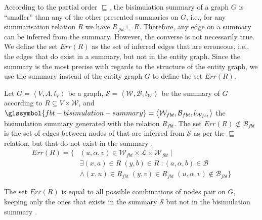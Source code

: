 According to the partial order $\sqsubseteq$, the bisimulation summary  of a graph $G$ is ``smaller'' than any of the other presented summaries on $G$, i.e., for any summarisation relation $R$ we have $R_{fbt} \sqsubseteq R$. Therefore, any edge on a summary can be inferred from the  summary. However, the converse is not necessarily true.\\

We define the set $Err(R)$ as the set of inferred edges that are erroneous, i.e., the edges that do exist in a summary, but not in the entity graph. Since the summary  is the most precise with regards to the structure of the entity graph, we use the summary  instead of the entity graph $G$ to define the set $Err(R)$.

\begin{definition}
Let $G=\left\langle V, A, l_V \right\rangle$ be a graph, $\mathcal{S} = \left\langle \mathcal{W}, \mathcal{B}, l_{\mathcal{W}} \right\rangle$ be the summary of $G$ according to $R \subseteq V \times \mathcal{W}$, and $\glssymbol{fbt-bisimulation-summary} = \left\langle \mathcal{W}_{fbt}, \mathcal{B}_{fbt}, l_{\mathcal{W}_{fbt}} \right\rangle$ the bisimulation summary generated with the relation $R_{fbt}$.
The set $Err(R) \not \subset \mathcal{B}_{fbt}$ is the set of edges between nodes of  that are inferred from $\mathcal{S}$ as per the $\sqsubseteq$ relation, but that do not exist in the summary .
\begin{equation*}
\begin{split}
Err(R) = \{ & (u, \alpha, v) \in \mathcal{W}_{fbt} \times \mathcal{L} \times \mathcal{W}_{fbt} \mid \\
 & \exists (x,a) \in R\; (y,b) \in R\;: (a, \alpha, b) \in \mathcal{B} \\
 & \wedge (x, u) \in R_{fbt}\; (y, v) \in R_{fbt}\; (u, \alpha, v) \not \in \mathcal{B}_{fbt} \}
\end{split}
\end{equation*}
\end{definition}

\begin{remark}
The set $Err(R)$ is equal to all possible combinations of nodes pair on $G$, keeping only the ones that exists in the summary $\mathcal{S}$ but not in the bisimulation summary .
\end{remark}

